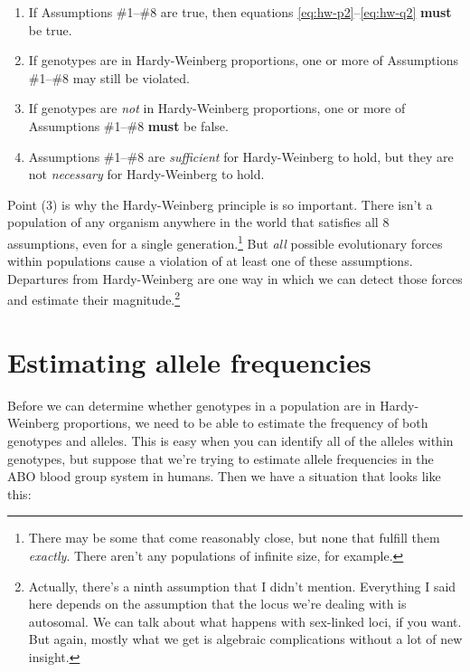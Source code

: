 \begin{enumerate}

\item If Assumptions \#1--\#8 are true, then equations
  \ref{eq:hw-p2}--\ref{eq:hw-q2} {\bf must} be true.

\item If genotypes are in Hardy-Weinberg proportions, one or more of
  Assumptions \#1--\#8 may still be violated.

\item If genotypes are {\it not\/} in Hardy-Weinberg proportions, one
  or more of Assumptions \#1--\#8 {\bf must} be false.

\item Assumptions \#1--\#8 are {\it sufficient\/} for Hardy-Weinberg
  to hold, but they are not {\it necessary\/} for Hardy-Weinberg to
  hold.

\end{enumerate}

Point (3) is why the Hardy-Weinberg principle is so important. There
isn't a population of any organism anywhere in the world that
satisfies all 8 assumptions, even for a single
generation.\footnote{There may be some that come reasonably close, but
  none that fulfill them {\it exactly}. There aren't any populations
  of infinite size, for example.}  But {\it all\/} possible
evolutionary forces within populations cause a violation of at least
one of these assumptions. Departures from Hardy-Weinberg are one way
in which we can detect those forces and estimate their
magnitude.\footnote{Actually, there's a ninth assumption that I didn't
  mention. Everything I said here depends on the assumption that the
  locus we're dealing with is autosomal. We can talk about what
  happens with sex-linked loci, if you want. But again, mostly what we
  get is algebraic complications without a lot of new insight.}

\section*{Estimating allele frequencies}

Before we can determine whether genotypes in a population are in
Hardy-Weinberg proportions, we need to be able to estimate the
frequency of both genotypes and alleles. This is easy when you can
identify all of the alleles within genotypes, but suppose that we're
trying to estimate allele frequencies in the ABO blood group system in
humans. Then we have a situation that looks like this:

